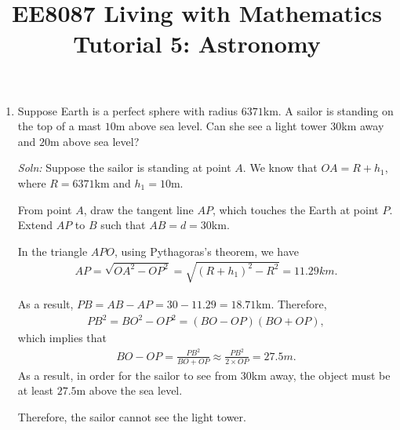 \documentclass{article}
\title{EE8087 Living with Mathematics\\Tutorial 5: Astronomy}
\date{}
\begin{document}
 \maketitle
\begin{enumerate}
\item Suppose Earth is a perfect sphere with radius $6371$km. A sailor is standing on the top of a mast $10$m above sea level. Can she see a light tower $30$km away and $20$m above sea level?

\begin{figure}[ht]
  \centering
\end{figure}

\emph{Soln:} Suppose the sailor is standing at point $A$. We know that $OA = R + h_1$, where $R = 6371$km and $h_1=10$m.

From point $A$, draw the tangent line $AP$, which touches the Earth at point $P$. Extend $AP$ to $B$ such that $AB = d = 30$km.

In the triangle $APO$, using Pythagoras's theorem, we have
\begin{align*}
  AP = \sqrt{OA^2 - OP^2} = \sqrt{(R+h_1)^2-R^2} = 11.29km.
\end{align*}

As a result, $PB = AB - AP = 30-11.29 = 18.71$km. Therefore,
\begin{align*}
  PB^2 = BO^2-OP^2 = (BO-OP)(BO+OP),
\end{align*}
which implies that
\begin{align*}
  BO-OP = \frac{PB^2}{BO+OP}\approx \frac{PB^2}{2\times OP} = 27.5m.
\end{align*}
As a result, in order for the sailor to see from $30$km away, the object must be at least $27.5$m above the sea level.

Therefore, the sailor cannot see the light tower.


\end{enumerate}
\end{document}
